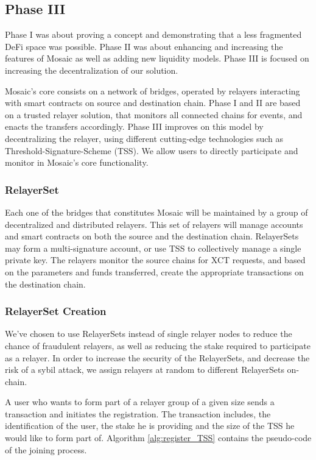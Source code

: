\subsection{Phase III\label{sec:phaseIII}}

Phase I was about proving a concept and demonstrating that a less fragmented DeFi space was possible. Phase II was about enhancing and increasing the features of Mosaic as well as adding new liquidity models. Phase III is focused on increasing the decentralization of our solution. 

Mosaic’s core consists on a network of bridges, operated by relayers interacting with smart contracts on source and destination chain. Phase I and II are based on a trusted relayer solution, that monitors all connected chains for events, and enacts the transfers accordingly. Phase III improves on this model by decentralizing the relayer, using different cutting-edge technologies such as Threshold-Signature-Scheme (TSS). We allow users to directly participate and monitor in Mosaic's core functionality.

\subsubsection*{RelayerSet}
Each one of the bridges that constitutes Mosaic will be maintained by a group of decentralized and distributed relayers. This set of relayers will manage accounts and smart contracts on both the source and the destination chain. RelayerSets may form a multi-signature account, or use TSS to collectively manage a single private key. The relayers monitor the source chains for XCT requests, and based on the parameters and funds transferred, create the appropriate transactions on the destination chain.

\subsubsection*{RelayerSet Creation}
We’ve chosen to use RelayerSets instead of single relayer nodes to reduce the chance of fraudulent relayers, as well as reducing the stake required to participate as a relayer. In order to increase the security of the RelayerSets, and decrease the risk of a sybil attack, we assign relayers at random to different RelayerSets on-chain.

A user who wants to form part of a relayer group of a given size sends a transaction and initiates the registration. The transaction includes, the identification of the user, the stake he is providing and the size of the TSS he would like to form part of. Algorithm \ref{alg:register_TSS} contains the pseudo-code of the joining process.

